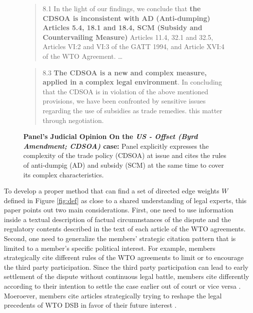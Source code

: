 \begin{figure}[h]
    \begin{quote}
        8.1 In the light of our findings, we conclude that \textbf{the CDSOA is inconsistent with AD (Anti-dumping)
        Articles 5.4, 18.1 and 18.4, SCM (Subsidy and Countervailing Measure)} Articles 11.4, 32.1 and 32.5, Articles VI:2 and VI:3 of the GATT
        1994, and Article XVI:4 of the WTO Agreement. \ldots
    \end{quote} 
    \begin{quote}
        8.3 \textbf{The CDSOA is a new and complex measure, applied in a complex legal environment}. In
        concluding that the CDSOA is in violation of the above mentioned provisions, we have been
        confronted by sensitive issues regarding the use of subsidies as trade remedies.
        this matter through negotiation.
    \end{quote} 
    \caption{\textbf{Panel's Judicial Opinion On the \textit{US - Offset (Byrd Amendment; CDSOA)} case:} Panel explicitly expresses the complexity of the trade policy (CDSOA) at issue and cites the rules of anti-dumpig (AD) and subsidy (SCM) at the same time to cover its complex characteristics.}
    \label{fig:complex-measure}
\end{figure}

To develop a proper method that can find a set of directed edge weights $W$ defined in Figure \ref{fig:def}
as close to a shared understanding of legal experts, this paper points out two main considerations. 
First, one need to use information inside a textual description of factual circumnstances of the dispute and the regulatory contents described in the text of each article of the WTO agreements.
Second, one need to generalize the members' strategic citation pattern that is limited to a member's specific political interest.
For example, members strategically cite different rules of the WTO agreements to limit or to encourage
the third party participation. Since the third party participation
can lead to early settlement of the dispute without continuous
legal battle, members cite differently according to their intention to
settle the case earlier out of court or vice versa \citep{who_gets}. Moeroever, members cite articles strategically trying to reshape the legal precedents of WTO DSB
in favor of their future interest \citep{pelc, latent}. 

